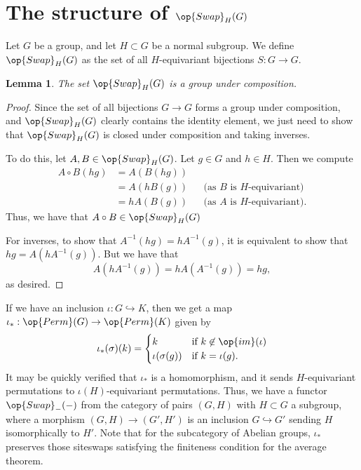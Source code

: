 \documentclass[12nt]{article}
\theoremstyle{plain}
\newtheorem{lemma}{Lemma}
\begin{document}
\section{The structure of $\op{Swap}_H(G)$}

Let $G$ be a group, and let $H \subset G$ be a normal subgroup. We define $\op{Swap}_H(G)$ as the set of all $H$-equivariant bijections $S : G \to G$. 

\begin{lemma}
The set $\op{Swap}_H(G)$ is a group under composition.
\end{lemma}

\begin{proof}
Since the set of all bijections $G \to G$ forms a group under composition, and $\op{Swap}_H(G)$ clearly contains the identity element, we just need to show that $\op{Swap}_H(G)$ is closed under composition and taking inverses.

To do this, let $A, B \in \op{Swap}_H(G)$. Let $g \in G$ and $h \in H$. Then we compute
\begin{align*}
A \circ B(hg) &= A(B(hg)) \\
	&= A(hB(g))  && \text{(as $B$ is $H$-equivariant)}\\
	&= hA(B(g)) && \text{(as $A$ is $H$-equivariant).}
\end{align*}
Thus, we have that $A \circ B \in \op{Swap}_H(G)$

For inverses, to show that $A^{-1}(hg) = hA^{-1}(g)$, it is equivalent to show that $hg = A(hA^{-1}(g))$. But we have that
\[
A(hA^{-1}(g)) = hA(A^{-1}(g)) = hg,
\]
as desired.
\end{proof}

If we have an inclusion $\iota : G \hookrightarrow K$, then we get a map $\iota_* : \op{Perm}(G) \to \op{Perm}(K)$ given by
\[
\iota_*(\sigma)(k) = \begin{cases}
k & \text{if } k \not \in \op{im}(\iota) \\
\iota(\sigma(g)) & \text{if } k = \iota(g).
\end{cases}
\]
It may be quickly verified that $\iota_*$ is a homomorphism, and it sends $H$-equivariant permutations to $\iota(H)$-equivariant permutations. Thus, we have a functor $\op{Swap}_{-}(-)$ from the category of pairs $(G, H)$ with $H \subset G$ a subgroup, where a morphism $(G, H) \to (G', H')$ is an inclusion $G \hookrightarrow G'$ sending $H$ isomorphically to $H'$. Note that for the subcategory of Abelian groups, $\iota_*$ preserves those siteswaps satisfying the finiteness condition for the average theorem.
\end{document}
